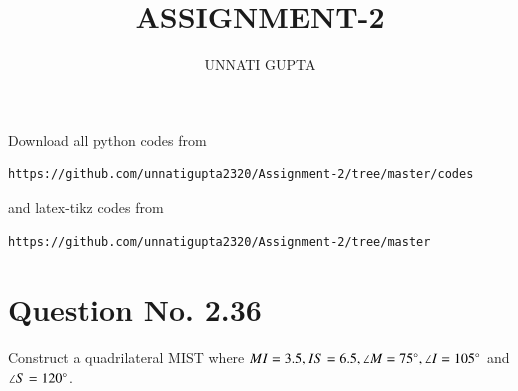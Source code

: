 \documentclass[journal,12pt,twocolumn]{IEEEtran}
\begin{document}
     \def\centbox#1{\makebox[0in]{#1}}
     \def\topbox#1{\raisebox{-\baselineskip}[0in][0in]{#1}}
     \def\midbox#1{\raisebox{-0.5\baselineskip}[0in][0in]{#1}}
\vspace{3cm}
\title{ASSIGNMENT-2}
\author{UNNATI GUPTA}
\maketitle
\newpage
\bigskip
\renewcommand{\thefigure}{\theenumi}
\renewcommand{\thetable}{\theenumi}
Download all python codes from 
\begin{lstlisting}
https://github.com/unnatigupta2320/Assignment-2/tree/master/codes
\end{lstlisting}
%
and latex-tikz codes from 
%
\begin{lstlisting}
https://github.com/unnatigupta2320/Assignment-2/tree/master
\end{lstlisting}
%
\section{Question No. 2.36}
Construct a quadrilateral MIST where $MI = 3.5, IS = 6.5, \angle M = 75 \degree, \angle I = 105 \degree$ and $\angle S = 120 \degree$.
%
\end{document}

